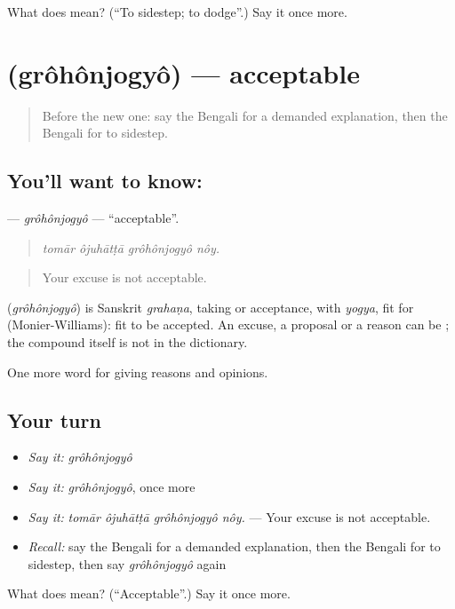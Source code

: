 \begin{tcolorbox}[breakable,colback=teal!4,colframe=teal!35!black,title={Before you move on}]
What does   mean? (\textquotedblleft{}To sidestep; to dodge\textquotedblright{}.) Say it once more.
\end{tcolorbox}
\section[\texorpdfstring{\bn{গ্রহণযোগ্য} (grôhônjogyô)}{গ্রহণযোগ্য (grôhônjogyô)}]{ (grôhônjogyô) — acceptable}

\label{lesson:BN-C359-grohonjogyo}



\begin{quote}
Before the new one: say the Bengali for a demanded explanation, then the Bengali for to sidestep.
\end{quote}

\subsection*{You'll want to know: }
\textbf{} — \emph{grôhônjogyô} — \textquotedblleft{}acceptable\textquotedblright{}.

\begin{quote}
   
\end{quote}

\begin{quote}
\emph{tomār ôjuhātṭā grôhônjogyô nôy.}
\end{quote}

\begin{quote}
Your excuse is not acceptable.
\end{quote}

\begin{cousinweb}
\textbf{} (\emph{grôhônjogyô}) is Sanskrit \emph{grahaṇa}, taking or acceptance, with \emph{yogya}, fit for (Monier-Williams): fit to be accepted. An excuse, a proposal or a reason can be ; the compound itself is not in the dictionary.
\end{cousinweb}

\begin{grammarlens}[title={What you've built}]
One more word for giving reasons and opinions.
\end{grammarlens}

\subsection*{Your turn}
\begin{itemize}
\raggedright
  \item \emph{Say it:} \emph{grôhônjogyô}
  \item \emph{Say it:} \emph{grôhônjogyô}, once more
  \item \emph{Say it:} \emph{tomār ôjuhātṭā grôhônjogyô nôy.} — Your excuse is not acceptable.
  \item \emph{Recall:} say the Bengali for a demanded explanation, then the Bengali for to sidestep, then say \emph{grôhônjogyô} again
\end{itemize}

\begin{tcolorbox}[breakable,colback=teal!4,colframe=teal!35!black,title={Before you move on}]
What does  mean? (\textquotedblleft{}Acceptable\textquotedblright{}.) Say it once more.
\end{tcolorbox}
